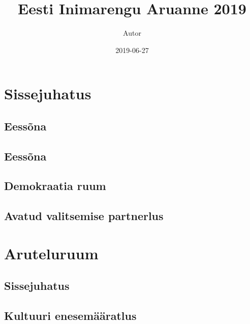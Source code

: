 \documentclass[]{book}
\title{Eesti Inimarengu Aruanne 2019}
\author{Autor}
\date{2019-06-27}
\begin{document}
\maketitle

{
\setcounter{tocdepth}{1}
\tableofcontents
}
\hypertarget{sissejuhatus}{%
\chapter*{Sissejuhatus}\label{sissejuhatus}}

\hypertarget{eessona}{%
\section*{Eessõna}\label{eessona}}

\hypertarget{eessona-1}{%
\section*{Eessõna}\label{eessona-1}}

\hypertarget{demokraatia-ruum}{%
\section*{Demokraatia ruum}\label{demokraatia-ruum}}

\hypertarget{avatud-valitsemise-partnerlus}{%
\section*{Avatud valitsemise partnerlus}\label{avatud-valitsemise-partnerlus}}

\hypertarget{chapter1}{%
\chapter{Aruteluruum}\label{chapter1}}

\hypertarget{sissejuhatus-1}{%
\section*{Sissejuhatus}\label{sissejuhatus-1}}

\hypertarget{chapter1_2}{%
\section{Kultuuri enesemääratlus}\label{chapter1_2}}
\end{document}
